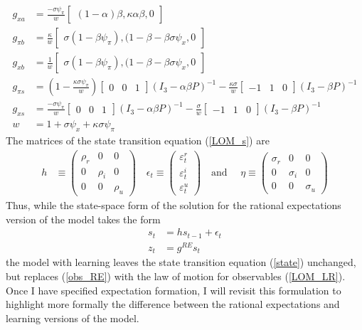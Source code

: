 \documentclass[11pt]{article}
\renewcommand{\[}{\begin{equation}}
\renewcommand{\]}{\end{equation}}
\begin{document}
\begin{align}
g_{x a} & =  \frac{-\sigma\psi_{\pi}}{w} \begin{bmatrix}(1-\alpha)\beta, \kappa\alpha\beta, 0 \end{bmatrix}\\
g_{\pi b} & = \frac{\kappa}{w} \begin{bmatrix}\sigma(1-\beta\psi_{\pi}), (1-\beta-\beta\sigma\psi_x, 0 \end{bmatrix}\\
g_{x b} & = \frac{1}{w} \begin{bmatrix}\sigma(1-\beta\psi_{\pi}), (1-\beta-\beta\sigma\psi_x, 0 \end{bmatrix} \\
g_{\pi s} & = (1-\frac{\kappa\sigma\psi_{\pi}}{w} )\begin{bmatrix} 0&0&1 \end{bmatrix} (I_3 - \alpha\beta P)^{-1} -\frac{\kappa\sigma}{w}\begin{bmatrix} -1&1&0 \end{bmatrix} (I_3 -\beta P)^{-1}\\
g_{x s} & =  \frac{-\sigma\psi_{\pi}}{w} \begin{bmatrix} 0&0&1 \end{bmatrix}(I_3 - \alpha\beta P)^{-1}  -\frac{\sigma}{w}\begin{bmatrix} -1&1&0 \end{bmatrix}(I_3 -\beta P)^{-1}\\
w & = 1+\sigma\psi_x +\kappa\sigma\psi_{\pi}
\end{align}
The matrices of the state transition equation (\ref{LOM_s}) are
 \begin{align}
 h  & \equiv \begin{pmatrix} \rho_r & 0 & 0 \\ 0& \rho_i & 0 \\ 0&0& \rho_u 
 \end{pmatrix}  \quad 
 \epsilon_t \equiv \begin{pmatrix}\varepsilon_t^{r} \\ \varepsilon_t^{i}  \\ \varepsilon_t^{u} 
 \end{pmatrix}  \quad  \text{and } \quad \eta  \equiv \begin{pmatrix} \sigma_r & 0 & 0 \\ 0& \sigma_i & 0 \\ 0&0& \sigma_u 
 \end{pmatrix} 
 \end{align}
 Thus, while the state-space form of the solution for the rational expectations version of the model takes the form
 \begin{align}
 s_t & = h s_{t-1} + \epsilon_t \label{state} \\
 z_t & = g^{RE} s_t \label{obs_RE}
 \end{align}
 the model with learning leaves the state transition equation (\ref{state}) unchanged, but replaces (\ref{obs_RE}) with the law of motion for observables (\ref{LOM_LR}). Once I have specified expectation formation, I will revisit this formulation to highlight more formally the difference between the rational expectations and learning versions of the model. 
\end{document}
